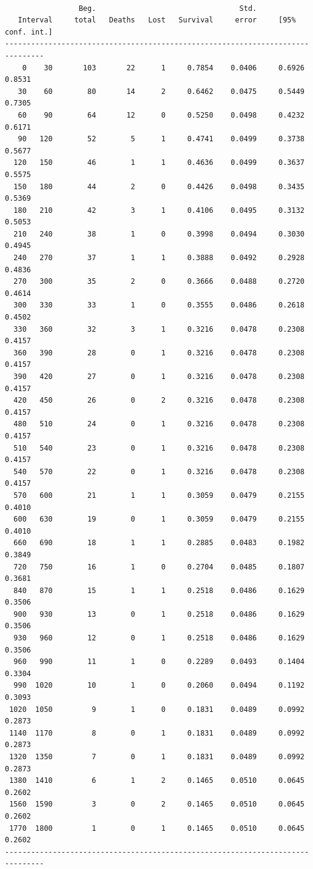 \documentclass[
  12pt,
  letterpaper,
  DIV=11,
  numbers=noendperiod,
  onepage,
  openany]{scrreprt}
\begin{document}
\begin{verbatim}

                 Beg.                                 Std.
   Interval     total   Deaths   Lost   Survival     error     [95% conf. int.]
-------------------------------------------------------------------------------
    0    30       103       22      1     0.7854    0.0406     0.6926    0.8531
   30    60        80       14      2     0.6462    0.0475     0.5449    0.7305
   60    90        64       12      0     0.5250    0.0498     0.4232    0.6171
   90   120        52        5      1     0.4741    0.0499     0.3738    0.5677
  120   150        46        1      1     0.4636    0.0499     0.3637    0.5575
  150   180        44        2      0     0.4426    0.0498     0.3435    0.5369
  180   210        42        3      1     0.4106    0.0495     0.3132    0.5053
  210   240        38        1      0     0.3998    0.0494     0.3030    0.4945
  240   270        37        1      1     0.3888    0.0492     0.2928    0.4836
  270   300        35        2      0     0.3666    0.0488     0.2720    0.4614
  300   330        33        1      0     0.3555    0.0486     0.2618    0.4502
  330   360        32        3      1     0.3216    0.0478     0.2308    0.4157
  360   390        28        0      1     0.3216    0.0478     0.2308    0.4157
  390   420        27        0      1     0.3216    0.0478     0.2308    0.4157
  420   450        26        0      2     0.3216    0.0478     0.2308    0.4157
  480   510        24        0      1     0.3216    0.0478     0.2308    0.4157
  510   540        23        0      1     0.3216    0.0478     0.2308    0.4157
  540   570        22        0      1     0.3216    0.0478     0.2308    0.4157
  570   600        21        1      1     0.3059    0.0479     0.2155    0.4010
  600   630        19        0      1     0.3059    0.0479     0.2155    0.4010
  660   690        18        1      1     0.2885    0.0483     0.1982    0.3849
  720   750        16        1      0     0.2704    0.0485     0.1807    0.3681
  840   870        15        1      1     0.2518    0.0486     0.1629    0.3506
  900   930        13        0      1     0.2518    0.0486     0.1629    0.3506
  930   960        12        0      1     0.2518    0.0486     0.1629    0.3506
  960   990        11        1      0     0.2289    0.0493     0.1404    0.3304
  990  1020        10        1      0     0.2060    0.0494     0.1192    0.3093
 1020  1050         9        1      0     0.1831    0.0489     0.0992    0.2873
 1140  1170         8        0      1     0.1831    0.0489     0.0992    0.2873
 1320  1350         7        0      1     0.1831    0.0489     0.0992    0.2873
 1380  1410         6        1      2     0.1465    0.0510     0.0645    0.2602
 1560  1590         3        0      2     0.1465    0.0510     0.0645    0.2602
 1770  1800         1        0      1     0.1465    0.0510     0.0645    0.2602
-------------------------------------------------------------------------------
\end{verbatim}
\end{document}
